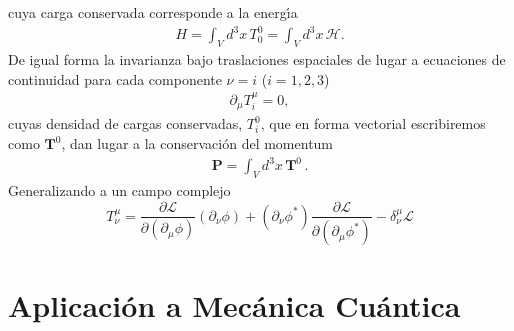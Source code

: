cuya carga conservada corresponde a la energ\'\i a
\begin{align}
  H=\int_V d^3x\, T^0_0=\int_V d^3x\,\mathcal{H}.
\end{align}
De igual forma la invarianza bajo traslaciones espaciales de lugar a ecuaciones de continuidad para cada componente $\nu=i$
 ($i=1,2,3$)
 \begin{align}
   \label{eq:235}
   \partial_\mu T^\mu_i=0,
 \end{align}
cuyas densidad de cargas conservadas, $T^0_i$, que en forma vectorial escribiremos como $\mathbf{T}^0$, dan lugar a la conservaci\'on del momentum
\begin{align}
  \mathbf{P}=\int_V d^3x\,\mathbf{T}^0\,.
\end{align}
Generalizando a un campo complejo
\begin{equation}
  \label{eq:138}
     T^\mu_\nu=\frac{\partial\mathcal{L}}{\partial(\partial_\mu\phi)}(\partial_\nu\phi)+(\partial_\nu\phi^*)\frac{\partial\mathcal{L}}{\partial(\partial_\mu\phi^*)}
      -\delta^\mu_\nu\mathcal{L}
\end{equation}




\section{Aplicaci\'on a Mec\'anica Cu\'antica}
\label{sec:aplic-mecan-cuant}

